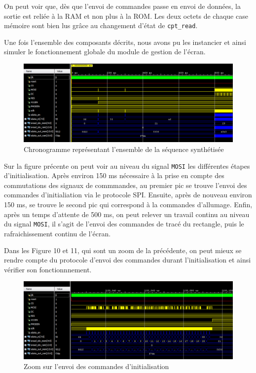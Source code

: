 \documentclass[11pt]{article}
\begin{document}
\begin{itemize}
\begin{itemize}
On peut voir que, dès que l'envoi de commandes passe en envoi de données, la sortie est reliée à la RAM et non plus à la ROM. Les deux octets de chaque case mémoire sont bien lus grâce au changement d'état de \texttt{cpt\_read}.

\end{itemize}

\end{itemize}

Une fois l'ensemble des composants décrits, nous avons pu les instancier et ainsi simuler le fonctionnement globale du module de gestion de l'écran.

\begin{figure}[H]
\begin{center}
\includegraphics[scale = 0.3, keepaspectratio]{chrono_1}
\caption{Chronogramme représentant l'ensemble de la séquence synthétisée}
\end{center}
\end{figure}

Sur la figure précente on peut voir au niveau du signal \texttt{MOSI} les différentes étapes d'initialisation. Après environ 150 ms nécessaire à la prise en compte des commutations des signaux de commmandes, au premier pic se trouve l'envoi des commandes d'initialiation via le protocole SPI. Ensuite, après de nouveau environ 150 ms, se trouve le second pic qui correspond à la commandes d'allumage. Enfin, après un temps d'attente de 500 ms, on peut relever un travail continu au niveau du signal \texttt{MOSI}, il s'agit de l'envoi des commandes de tracé du rectangle, puis le rafraichissement continu de l'écran.

Dans les Figure 10 et 11, qui sont un zoom de la précédente, on peut mieux se rendre compte du protocole d'envoi des commandes durant l'initialisation et ainsi vérifier son fonctionnnement.

\begin{figure}[H]
\begin{center}
\includegraphics[scale = 0.3, keepaspectratio]{chrono_2}
\caption{Zoom sur l'envoi des commandes d'initialisation}
\end{center}
\end{figure}
\end{document}
